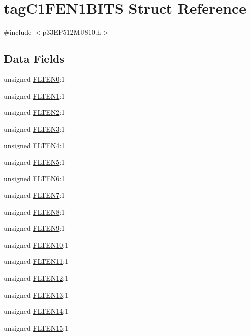 \hypertarget{structtag_c1_f_e_n1_b_i_t_s}{}\section{tag\+C1\+F\+E\+N1\+B\+I\+TS Struct Reference}
\label{structtag_c1_f_e_n1_b_i_t_s}


{\ttfamily \#include $<$p33\+E\+P512\+M\+U810.\+h$>$}

\subsection*{Data Fields}
\begin{DoxyCompactItemize}
\item 
unsigned \hyperlink{structtag_c1_f_e_n1_b_i_t_s_aa79670b83376618bf0d6500c5165c765}{F\+L\+T\+E\+N0}\+:1
\item 
unsigned \hyperlink{structtag_c1_f_e_n1_b_i_t_s_aad6b481848368016ab582c7e1c562cb6}{F\+L\+T\+E\+N1}\+:1
\item 
unsigned \hyperlink{structtag_c1_f_e_n1_b_i_t_s_a0f944c21ae938d1bf82615a3a54a9bee}{F\+L\+T\+E\+N2}\+:1
\item 
unsigned \hyperlink{structtag_c1_f_e_n1_b_i_t_s_a1fdf3db50007b303ac5dcec8ae965b7d}{F\+L\+T\+E\+N3}\+:1
\item 
unsigned \hyperlink{structtag_c1_f_e_n1_b_i_t_s_af6599d3321c033afd86a72884b0c2b50}{F\+L\+T\+E\+N4}\+:1
\item 
unsigned \hyperlink{structtag_c1_f_e_n1_b_i_t_s_a43252a3bbc838478323d264c05817eea}{F\+L\+T\+E\+N5}\+:1
\item 
unsigned \hyperlink{structtag_c1_f_e_n1_b_i_t_s_ab353d0857baf0914716766e16b887832}{F\+L\+T\+E\+N6}\+:1
\item 
unsigned \hyperlink{structtag_c1_f_e_n1_b_i_t_s_acaf31ffb3c4c299569a520b25209e443}{F\+L\+T\+E\+N7}\+:1
\item 
unsigned \hyperlink{structtag_c1_f_e_n1_b_i_t_s_a3d4485461e50847e8dbe581c6a094df8}{F\+L\+T\+E\+N8}\+:1
\item 
unsigned \hyperlink{structtag_c1_f_e_n1_b_i_t_s_a55018b7d7f9966a022e6ce4585c68d78}{F\+L\+T\+E\+N9}\+:1
\item 
unsigned \hyperlink{structtag_c1_f_e_n1_b_i_t_s_a21aff454d256334c89e0a8d6a165a4c5}{F\+L\+T\+E\+N10}\+:1
\item 
unsigned \hyperlink{structtag_c1_f_e_n1_b_i_t_s_a561c8c98ec161d6da6009ea1ff0d6f39}{F\+L\+T\+E\+N11}\+:1
\item 
unsigned \hyperlink{structtag_c1_f_e_n1_b_i_t_s_a6c7fb5e256d7db18e204e798bd9ada82}{F\+L\+T\+E\+N12}\+:1
\item 
unsigned \hyperlink{structtag_c1_f_e_n1_b_i_t_s_ab336ddebd823774fbf1a68116b19f15c}{F\+L\+T\+E\+N13}\+:1
\item 
unsigned \hyperlink{structtag_c1_f_e_n1_b_i_t_s_ad4d67d7cc4af66d21709cd82a7767087}{F\+L\+T\+E\+N14}\+:1
\item 
unsigned \hyperlink{structtag_c1_f_e_n1_b_i_t_s_ababc9952ac7a911c84e0c6acf548b19a}{F\+L\+T\+E\+N15}\+:1
\end{DoxyCompactItemize}



